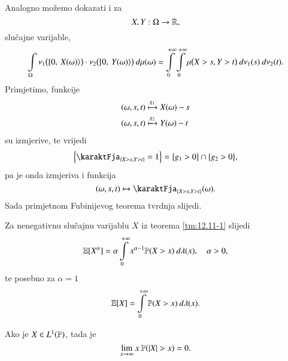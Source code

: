 \begin{nap} \label{nap:12.11-1-1}
    Analogno mo\v zemo dokazati i za
    \begin{equation*}
        X, Y : \Omega \to \mathbb{R},
    \end{equation*}
    slu\v cajne varijable,
    \begin{equation*}
        \int\limits_\Omega \nu_1 \big([ {0}, \: {X(\omega)} \rangle\big) \cdot \nu_2 \big( [ {0}, \: {Y(\omega)} \rangle\big) \: d \mu (\omega) = \int\limits_0^{+\infty} \int\limits_0^{+\infty} \mu \big(  X > s, Y > t \big) \: d \nu_1 (s) \: d \nu_2 (t).
    \end{equation*}
    Primjetimo, funkcije
    \begin{equation*}
        \begin{aligned}
            (\omega, s, t) &\xmapsto{g_1} X(\omega) - s\\
            (\omega, s, t) &\xmapsto{g_2} Y(\omega) - t
        \end{aligned}
    \end{equation*}
    su izmjerive, te vrijedi
    \begin{equation*}
        \Big\{ \karaktFja_{\{ X > s, Y > t \}} = 1 \Big\} = \big\{ g_1 > 0 \big\} \cap \big\{ g_2 > 0 \big\},
    \end{equation*}
    pa je onda izmjeriva i funkcija
    \begin{equation*}
        (\omega, s, t) \mapsto \karaktFja_{\{ X > s, Y > t \}} (\omega).
    \end{equation*}
    Sada primjetnom Fubinijevog teorema tvrdnja slijedi.
\end{nap}

\begin{nap} \label{nap:12.11-2}
    Za nenegativnu slu\v cajnu varijablu $X$ iz teorema \ref{tm:12.11-1} slijedi
    \begin{equation*}
        \mathbb{E} [X^\alpha] = \alpha \int\limits_{0}^{+\infty} x^{\alpha - 1} \mathbb{P} (X > x) \: d \lambda (x), \quad \alpha > 0,
    \end{equation*}
    te posebno za $\alpha = 1$
    \begin{equation*}
        \mathbb{E} [X] = \int\limits_{0}^{+\infty} \mathbb{P} (X > x) \: d \lambda (x).
    \end{equation*}
\end{nap}

\begin{zad} \label{zad:12.12}
    Ako je $X \in L^1(\mathbb{P})$, tada je
    \begin{equation*}
        \lim\limits_{x \to \infty} x \: \mathbb{P}({|X| > x}) = 0.
    \end{equation*}
\end{zad}

